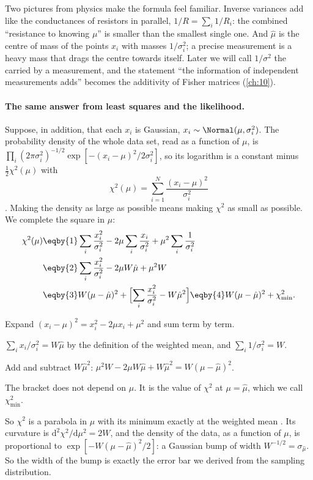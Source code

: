 Two pictures from physics make the formula feel familiar. Inverse variances
add like the conductances of resistors in parallel, $1/R=\sum_i1/R_i$: the
combined ``resistance to knowing $\mu$'' is smaller than the smallest
single one. And $\hat\mu$ is the centre of mass of the points $x_i$ with
masses $1/\sigma_i^2$; a precise measurement is a heavy mass that drags the
centre towards itself. Later we will call $1/\sigma^2$ the
 carried by a measurement, and the statement ``the
information of independent measurements adds'' becomes the additivity of
Fisher matrices (\cref{ch:10}).

\paragraph{The same answer from least squares and the likelihood.}
Suppose, in addition, that each $x_i$ is Gaussian,
$x_i\sim\Normal(\mu,\sigma_i^2)$. The probability density of the whole data
set, read as a function of $\mu$, is
$\prod_i(2\pi\sigma_i^2)^{-1/2}\exp[-(x_i-\mu)^2/2\sigma_i^2]$, so its
logarithm is a constant minus $\tfrac12\chi^2(\mu)$ with
\begin{equation}
  \chi^2(\mu)=\sum_{i=1}^N\frac{(x_i-\mu)^2}{\sigma_i^2}
  \label{3a:eq:wmean-chi2}
\end{equation}
. Making the density as large as possible means making
$\chi^2$ as small as possible. We complete the square in $\mu$:
\begin{align}
  \chi^2(\mu)
  &\eqby{1} \sum_i\frac{x_i^2}{\sigma_i^2}-2\mu\sum_i\frac{x_i}{\sigma_i^2}+\mu^2\sum_i\frac{1}{\sigma_i^2}\notag\\
  &\eqby{2} \sum_i\frac{x_i^2}{\sigma_i^2}-2\mu W\hat\mu+\mu^2W\notag\\
  &\eqby{3} W(\mu-\hat\mu)^2+\Bigl[\sum_i\frac{x_i^2}{\sigma_i^2}-W\hat\mu^2\Bigr]
   \eqby{4} W(\mu-\hat\mu)^2+\chi^2_{\min}.
  \label{3a:eq:wmean-square}
\end{align}
\begin{explain}
  \item Expand $(x_i-\mu)^2=x_i^2-2\mu x_i+\mu^2$ and sum term by term.
  \item $\sum_ix_i/\sigma_i^2=W\hat\mu$ by the definition of the weighted
        mean, and $\sum_i1/\sigma_i^2=W$.
  \item Add and subtract $W\hat\mu^2$: $\mu^2W-2\mu W\hat\mu+W\hat\mu^2=W(\mu-\hat\mu)^2$.
  \item The bracket does not depend on $\mu$. It is the value of $\chi^2$ at
        $\mu=\hat\mu$, which we call $\chi^2_{\min}$.
\end{explain}
So $\chi^2$ is a parabola in $\mu$ with its minimum exactly at the weighted
mean . Its curvature is
$\mathrm d^2\chi^2/\mathrm d\mu^2=2W$, and the density of the data, as a
function of $\mu$, is proportional to $\exp[-W(\mu-\hat\mu)^2/2]$: a
Gaussian bump of width $W^{-1/2}=\sigma_{\hat\mu}$. So the width of the
bump is exactly the error bar we derived from the sampling distribution.

